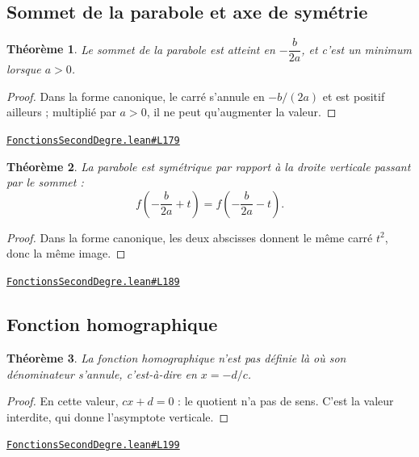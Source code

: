 \documentclass[11pt,a4paper]{article}
\theoremstyle{definition}
\theoremstyle{plain}
\newtheorem{theoreme}{Théorème}
\newcommand{\source}[2]{\par\smallskip\noindent\hfill{\footnotesize\href{#1}{\texttt{#2}}}\par\smallskip}
\begin{document}
\subsection{Sommet de la parabole et axe de symétrie}

\begin{theoreme}
Le sommet de la parabole est atteint en $-\dfrac{b}{2a}$, et c'est un minimum lorsque
$a > 0$.
\end{theoreme}

\begin{proof}
Dans la forme canonique, le carré s'annule en $-b/(2a)$ et est positif ailleurs ;
multiplié par $a > 0$, il ne peut qu'augmenter la valeur.
\end{proof}
\source{https://github.com/Commutator-IO/learn-lean/blob/main/cours/02-lycee/02-fonctions-second-degre/FonctionsSecondDegre.lean\#L179}{FonctionsSecondDegre.lean\#L179}

\begin{theoreme}
La parabole est symétrique par rapport à la droite verticale passant par le sommet :
\[ f\left(-\frac{b}{2a} + t\right) = f\left(-\frac{b}{2a} - t\right) . \]
\end{theoreme}

\begin{proof}
Dans la forme canonique, les deux abscisses donnent le même carré $t^2$, donc la même
image.
\end{proof}
\source{https://github.com/Commutator-IO/learn-lean/blob/main/cours/02-lycee/02-fonctions-second-degre/FonctionsSecondDegre.lean\#L189}{FonctionsSecondDegre.lean\#L189}

\subsection{Fonction homographique}

\begin{theoreme}
La fonction homographique n'est pas définie là où son dénominateur s'annule, c'est-à-dire
en $x = -d/c$.
\end{theoreme}

\begin{proof}
En cette valeur, $cx + d = 0$ : le quotient n'a pas de sens. C'est la valeur interdite,
qui donne l'asymptote verticale.
\end{proof}
\source{https://github.com/Commutator-IO/learn-lean/blob/main/cours/02-lycee/02-fonctions-second-degre/FonctionsSecondDegre.lean\#L199}{FonctionsSecondDegre.lean\#L199}
\end{document}
